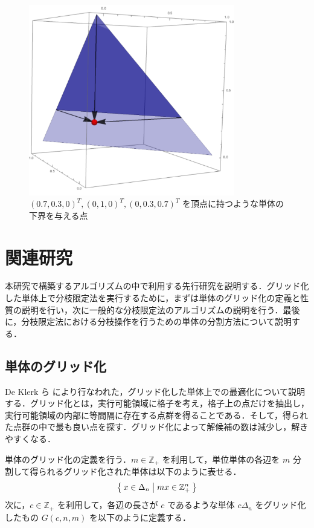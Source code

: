 \documentclass[a4paper,11pt]{jreport}
\begin{document}
\begin{figure}
\begin{center}
\includegraphics[width=9cm]{graphs/lower_bound_of_simplex.pdf}
\caption{$ (0.7, 0.3, 0)^T, (0, 1, 0)^T, (0, 0.3, 0.7)^T $ を頂点に持つような単体の下界を与える点}
\label{fig:lower_bound_of_simplex}
\end{center}
\end{figure}

\chapter{関連研究}

本研究で構築するアルゴリズムの中で利用する先行研究を説明する．グリッド化した単体上で分枝限定法を実行するために，まずは単体のグリッド化の定義と性質の説明を行い，次に一般的な分枝限定法のアルゴリズムの説明を行う．最後に，分枝限定法における分枝操作を行うための単体の分割方法について説明する．

\section{単体のグリッド化} \label{sec:gridize_simplex}

De Klerk ら \cite{deklerk} により行なわれた，グリッド化した単体上での最適化について説明する．グリッド化とは，実行可能領域に格子を考え，格子上の点だけを抽出し，実行可能領域の内部に等間隔に存在する点群を得ることである．そして，得られた点群の中で最も良い点を探す．グリッド化によって解候補の数は減少し，解きやすくなる．\par
単体のグリッド化の定義を行う．$ m \in \mathbb{Z}_+ $ を利用して，単位単体の各辺を $ m $ 分割して得られるグリッド化された単体は以下のように表せる．
$$ \Set{ x \in \Delta_n | mx \in \mathbb{Z}_+^n } $$
次に，$ c \in \mathbb{Z}_+ $ を利用して，各辺の長さが $ c $ であるような単体 $ c \Delta_n $ をグリッド化したもの $ G(c, n, m) $ を以下のように定義する．
\end{document}
